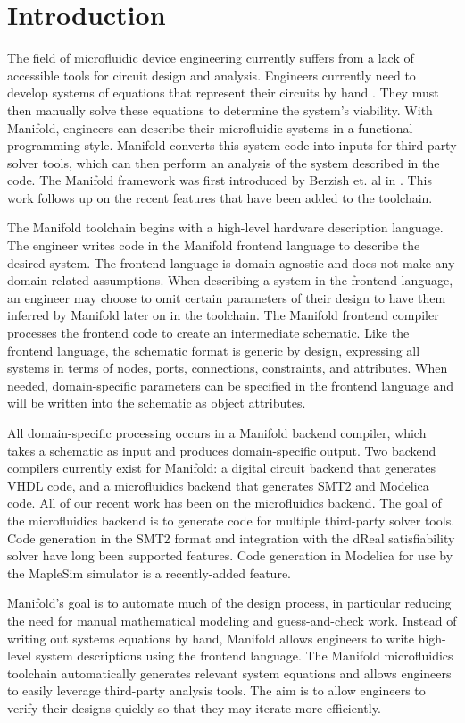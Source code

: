 \section{Introduction}

The field of microfluidic device engineering currently suffers from a lack of accessible tools for circuit design and analysis.
Engineers currently need to develop systems of equations that represent their circuits by hand \cite{Thorsen02science}.
They must then manually solve these equations to determine the system's viability.
With Manifold, engineers can describe their microfluidic systems in a functional programming style. 
Manifold converts this system code into inputs for third-party solver tools, which can then perform an analysis of the system described in the code.
The Manifold framework was first introduced by Berzish et. al in \cite{Berzish16cascon}.
This work follows up on the recent features that have been added to the toolchain.

The Manifold toolchain begins with a high-level hardware description language.
The engineer writes code in the Manifold frontend language to describe the desired system.
The frontend language is domain-agnostic and does not make any domain-related assumptions.
When describing a system in the frontend language, an engineer may choose to omit certain parameters of their design to have them inferred by Manifold later on in the toolchain.
The Manifold frontend compiler processes the frontend code to create an intermediate schematic.
Like the frontend language, the schematic format is generic by design, expressing all systems in terms of nodes, ports, connections, constraints, and attributes.
When needed, domain-specific parameters can be specified in the frontend language and will be written into the schematic as object attributes.

All domain-specific processing occurs in a Manifold backend compiler, which takes a schematic as input and produces domain-specific output.
Two backend compilers currently exist for Manifold: a digital circuit backend that generates VHDL code, and a microfluidics backend that generates SMT2 and Modelica code.
All of our recent work has been on the microfluidics backend.
The goal of the microfluidics backend is to generate code for multiple third-party solver tools.
Code generation in the SMT2 format and integration with the dReal satisfiability solver \cite{Gao13dReal} have long been supported features.
Code generation in Modelica for use by the MapleSim simulator is a recently-added feature.

Manifold's goal is to automate much of the design process, in particular reducing the need for manual mathematical modeling and guess-and-check work.
Instead of writing out systems equations by hand, Manifold allows engineers to write high-level system descriptions using the frontend language.
The Manifold microfluidics toolchain automatically generates relevant system equations and allows engineers to easily leverage third-party analysis tools.
The aim is to allow engineers to verify their designs quickly so that they may iterate more efficiently.
